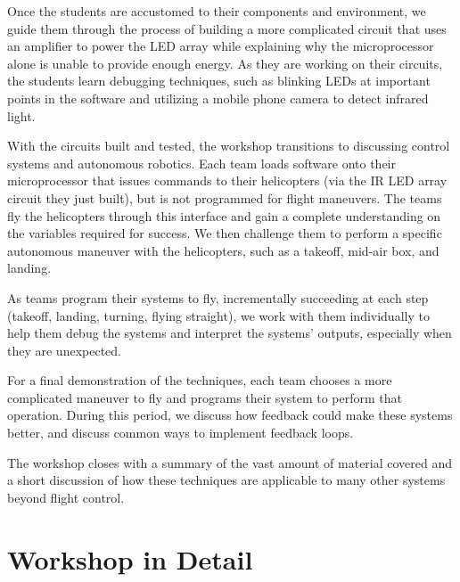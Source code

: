 \documentclass[11pt]{article}
\begin{document}
Once the students are accustomed to their components and environment, we guide them through the process of building a more complicated circuit that uses an amplifier to power the LED array while explaining why the microprocessor alone is unable to provide enough energy.  As they are working on their circuits, the students learn debugging techniques, such as blinking LEDs at important points in the software and utilizing a mobile phone camera to detect infrared light.

With the circuits built and tested, the workshop transitions to discussing control systems and autonomous robotics.  Each team loads software onto their microprocessor that issues commands to their helicopters (via the IR LED array circuit they just built), but is not programmed for flight maneuvers.  The teams fly the helicopters through this interface and gain a complete understanding on the variables required for success.  We then challenge them to perform a specific autonomous maneuver with the helicopters, such as a takeoff, mid-air box, and landing.

As teams program their systems to fly, incrementally succeeding at each step (takeoff, landing, turning, flying straight), we work with them individually to help them debug the systems and interpret the systems’ outputs, especially when they are unexpected.

For a final demonstration of the techniques, each team chooses a more complicated maneuver to fly and programs their system to perform that operation.  During this period, we discuss how feedback could make these systems better, and discuss common ways to implement feedback loops.

The workshop closes with a summary of the vast amount of material covered and a short discussion of how these techniques are applicable to many other systems beyond flight control.

\section*{Workshop in Detail}
\end{document}
